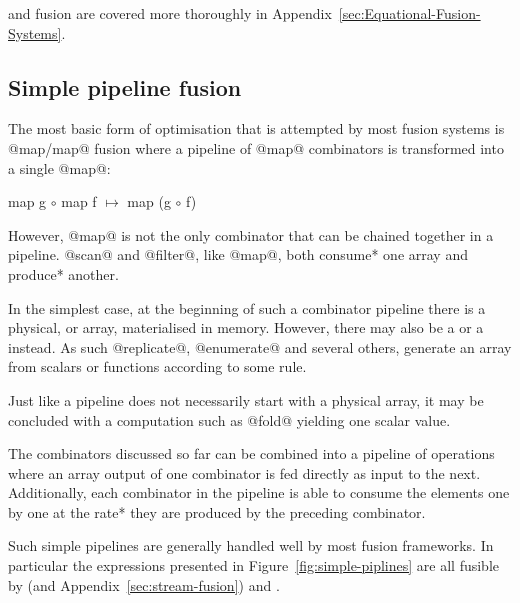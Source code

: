\documentclass[preamble.tex]{subfiles}
\begin{document}
\StreamFusion and  fusion are covered more thoroughly in Appendix~\ref{sec:Equational-Fusion-Systems}.



\subsection{Simple pipeline fusion}
\label{sec:straight-line}

The most basic form of optimisation that is attempted by most fusion systems is @map/map@ fusion where a pipeline of @map@ combinators is transformed into a single @map@:

\begin{hscode}[mathescape]
map g $\circ$ map f $\mapsto$ map (g $\circ$ f)
\end{hscode}

However, @map@ is not the only combinator that can be chained together in a pipeline. @scan@ and @filter@, like @map@, both \*consume* one array and \*produce* another.

In the simplest case, at the beginning of such a combinator pipeline there is a physical, or \imanifest array, materialised in memory. However, there may also be a  or a \igencomb instead. As such @replicate@, @enumerate@ and several others, generate an array from scalars or functions according to some rule.

Just like a pipeline does not necessarily start with a physical array, it may be concluded with a computation such as @fold@ yielding one scalar value.

The combinators discussed so far can be combined into a pipeline of operations where an array output of one combinator is fed directly as input to the next. Additionally, each combinator in the pipeline is able to consume the elements one by one at the \*rate* they are produced by the preceding combinator.


Such simple pipelines are generally handled well by most fusion frameworks. In particular the expressions presented in Figure~\ref{fig:simple-piplines} are all fusible by \StreamFusion \cite{CLS07} (and Appendix~\ref{sec:stream-fusion}) and  \cite{CK01}.
\end{document}
